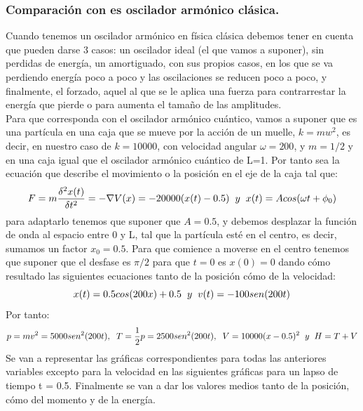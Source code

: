 \documentclass[12pt,paper]{article}
\begin{document}
\subsubsection{Comparación con es oscilador armónico clásica.}
Cuando tenemos un oscilador armónico en física clásica debemos tener en cuenta que pueden darse 3 casos: un oscilador ideal (el que vamos a suponer), sin perdidas de energía, un amortiguado, con sus propios casos, en los que se va perdiendo energía poco a poco y las oscilaciones se reducen poco a poco, y finalmente, el forzado, aquel al que se le aplica una fuerza para contrarrestar la energía que pierde o para aumenta el tamaño de las amplitudes.\\
Para que corresponda con el oscilador armónico cuántico, vamos a suponer que es una partícula en una caja que se mueve por la acción de un muelle, $k = mw^2$, es decir, en nuestro caso de $k=10000$, con velocidad angular $\omega = 200$, y $m=1/2$ y en una caja igual que el oscilador armónico cuántico de L=1. Por tanto sea la ecuación que describe el movimiento o la posición en el eje de la caja tal que:
\begin{equation*}
    F = m\frac{\delta^2x(t)}{\delta t^2} = - \nabla V(x) = -20000(x(t)-0.5) \hspace{2mm} y \hspace{2mm} x(t) = Acos(\omega t + \phi_0)
\end{equation*}
para adaptarlo tenemos que suponer que $A=0.5$, y debemos desplazar la función de onda al espacio entre 0 y L, tal que la partícula esté en el centro, es decir, sumamos un factor $x_0=0.5$. Para que comience a moverse en el centro tenemos que suponer que el desfase es $\pi/2$ para que $t=0$ es $x(0) = 0$ dando cómo resultado las siguientes ecuaciones tanto de la posición cómo de la velocidad:
\begin{equation*}
    x(t) = 0.5cos(200x) + 0.5 \hspace{2mm} y \hspace{2mm} v(t)=-100sen(200t)
\end{equation*}
Por tanto:
\begin{equation*}
    p = mv^2 = 5000sen^2(200t), \hspace{2mm} T = \frac{1}{2}p=2500sen^2(200t), \hspace{2mm}V = 10000(x-0.5)^2 \hspace{2mm} y \hspace{2mm} H = T+V
\end{equation*}
Se van a representar las gráficas correspondientes para todas las anteriores variables excepto para la velocidad en las siguientes gráficas para un lapso de tiempo t = 0.5. Finalmente se van a dar los valores medios tanto de la posición, cómo del momento y de la energía.\\
\end{document}

